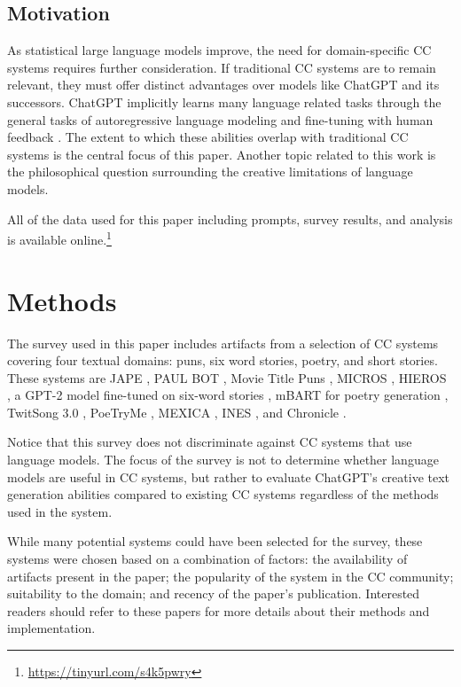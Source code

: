 \documentclass[phd,electronic,oneside,twosidetoc,letterpaper,chaptercenter,parttop,lof]{byumsphd}
\begin{document}
\subsection{Motivation}

As statistical large language models improve, the need for domain-specific CC systems requires further consideration.
If traditional CC systems are to remain relevant, they must offer distinct advantages over models like ChatGPT and its successors.
ChatGPT implicitly learns many language related tasks through the general tasks of autoregressive language modeling \cite{radford2018gpt2} and fine-tuning with human feedback \cite{ouyang2022instructgpt}.
The extent to which these abilities overlap with traditional CC systems is the central focus of this paper.
Another topic related to this work is the philosophical question surrounding the creative limitations of language models.



All of the data used for this paper including prompts, survey results, and analysis is available online.\footnote{\url{https://tinyurl.com/s4k5pwry}}



\section{Methods}

The survey used in this paper includes artifacts from a selection of CC systems covering four textual domains: puns, six word stories, poetry, and short stories. 
These systems are JAPE \cite{ritchie2003jape}, PAUL BOT \cite{tyler2020puns}, Movie Title Puns \cite{hamalainen2019movie}, MICROS \cite{spendlove2018micros}, HIEROS \cite{spendlove2020hieros}, a GPT-2 model fine-tuned on six-word stories \cite{chiengenerating}, mBART for poetry generation \cite{boggia2022poetry}, TwitSong 3.0 \cite{lamb2019poetry}, PoeTryMe \cite{oliveira2016poetryme}, MEXICA \cite{perez2001mexica}, INES \cite{concepcion2019ines}, and Chronicle \cite{Pickering2017}.

Notice that this survey does not discriminate against CC systems that use language models.
The focus of the survey is not to determine whether language models are useful in CC systems, but rather to evaluate ChatGPT's creative text generation abilities compared to existing CC systems regardless of the methods used in the system.

While many potential systems could have been selected for the survey, these systems were chosen based on a combination of factors: the availability of artifacts present in the paper; the popularity of the system in the CC community; suitability to the domain; and recency of the paper's publication.
Interested readers should refer to these papers for more details about their methods and implementation.
\end{document}
